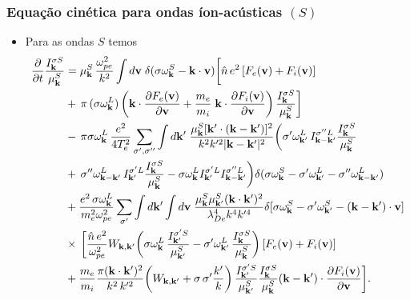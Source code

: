 \documentclass[10pt,aspectratio=1610,lualatex]{beamer}
\begin{document}
\begin{frame}
  \frametitle{Equação cinética para ondas íon-acústicas $(S)$}
  \begin{itemize}
  \item Para as ondas $S$ temos
    \begin{equation}
      \label{S}
      \begin{split}
	\frac{\partial}{\partial t}\frac{I_{\bf k}^{\sigma S}}{\mu_{\bf k}^S}
	&=\mu_{\bf k}^S\,\frac{\omega_{pe}^2}{k^2} \int d{\bf v}\;
	\delta(\sigma\omega_{\bf k}^S-{\bf k}\cdot{\bf v})
	\biggl[\hat{n}\,e^2\,[F_e({\bf v})+F_i({\bf v})]\\
	&+\,\pi\,(\sigma\omega_{\bf k}^L)\,\biggl({\bf k}\cdot
	\frac{\partial F_e({\bf v})}{\partial{\bf v}}
	+\frac{m_e}{m_i}\;{\bf k}\cdot
	\frac{\partial F_i({\bf v})}{\partial{\bf v}}\biggr)\,
	\frac{I_{\bf k}^{\sigma S}}{\mu_{\bf k}^S}\biggr]\\
	&-\,\pi\sigma\omega_{\bf k}^L\,\frac{e^2}{4T_e^2}
	\sum_{\sigma ',\sigma ''}\int d{\bf k'}\;
	\frac{\mu_{\bf k}^S[{\bf k'}
	  \cdot({\bf k}-{\bf k}')]^2}{k^2k'^2|{\bf k}-{\bf k}'|^2}
	\biggl(\sigma '	\omega_{{\bf k}'}^L\, I_{{\bf k}-{\bf k}'}^{\sigma ''L}
	\frac{I_{\bf k}^{\sigma S}}{\mu_{\bf k}^S}\\
	&+\,\sigma ''\omega_{{\bf k}-{\bf k}'}^L \,
	I_{{\bf k}'}^{\sigma 'L}\frac{I_{\bf k}^{\sigma S}}{\mu_{\bf k}^S}
	-\sigma\omega_{\bf k}^LI_{{\bf k}'}^{\sigma 'L}
	I_{{\bf k}-{\bf k}'}^{\sigma ''L}\biggr)
	\delta(\sigma\omega_{\bf k}^S-\sigma '\omega_{{\bf k}'}^L
	-\sigma ''\omega_{{\bf k}-{\bf k}'}^L)\\
	&+\frac{e^2\,\sigma\omega_{\bf k}^L}{m_e^2\omega_{pe}^2}
	\sum_{\sigma '} \int d{\bf k'}\int d{\bf v}\;
	\frac{\mu_{\bf k}^S\mu_{{\bf k '}}^S({\bf k}\cdot{\bf k}')^2}
	{\lambda_{De}^4k^4k'^4} \delta[\sigma\omega_{\bf k}^S-\sigma '
	\omega_{{\bf k}'}^S-({\bf k}-{\bf k}')\cdot{\bf v}]\\
	&\times\,\biggl[\frac{\hat{n}\,e^2}{\omega_{pe}^2}
	W_{{\bf k},{\bf k}'} \biggl(\sigma\omega_{\bf k}^L\,
	\frac{I_{{\bf k}'}^{\sigma 'S}}{\mu_{{\bf k}'}^S}
	-\sigma '\omega_{{\bf k}'}^L\,
	\frac{I_{\bf k}^{\sigma S}}{\mu_{\bf k}^S}\biggr)\,
	[F_e({\bf v})+F_i({\bf v})]\\
	&+\frac{m_e}{m_i}\frac{\pi({\bf k}\cdot{\bf k}')^2}{k^2\,k'^2}
	\biggl(W_{{\bf k},{\bf k}'}+\sigma\,\sigma ' \frac{k'}{k}\biggr)\,
	\frac{I_{{\bf k}'}^{\sigma 'S}}{\mu_{{\bf k}'}^S}
	\frac{I_{\bf k}^{\sigma S}}{\mu_{\bf k}^S}({\bf k}-{\bf k}')
	\cdot\frac{\partial F_i({\bf v})}{\partial{\bf v}}\biggr].
      \end{split}
    \end{equation}
  \end{itemize}
\end{frame}
\end{document}
